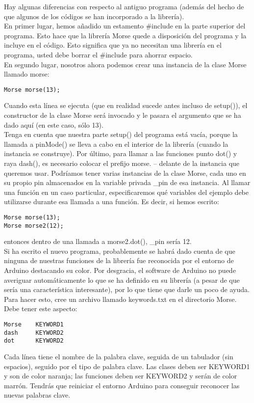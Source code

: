 Hay algunas diferencias con respecto al antiguo programa (además del hecho de que algunos de los códigos se han incorporado a la librería).\\
En primer lugar, hemos añadido un estamento \#include en la parte superior del programa. Esto hace que la librería Morse quede a disposición del programa y la incluye en el código. Esto significa que ya no necesitan una librería en el programa, usted debe borrar el \#include para ahorrar espacio.\\
En segundo lugar, nosotros ahora podemos crear una instancia de la clase Morse llamado morse:
\begin{lstlisting}
Morse morse(13);
\end{lstlisting}
Cuando esta línea se ejecuta (que en realidad sucede antes incluso de setup()), el constructor de la clase Morse será invocado y le pasara el argumento que se ha dado aquí (en este caso, sólo 13).\\
Tenga en cuenta que nuestra parte setup() del programa está vacía, porque la llamada a pinMode() se lleva a cabo en el interior de la librería (cuando la instancia se construye).
Por último, para llamar a las funciones punto \mbox{dot()} y raya \mbox{dash()}, es necesario colocar el prefijo morse. – delante de la instancia que queremos usar. Podríamos tener varias instancias de la clase Morse, cada uno en su propio pin almacenados en la variable privada \_pin de esa instancia. Al llamar una función en un caso particular, especificaremos qué variables del ejemplo debe utilizarse durante esa llamada a una función. Es decir, si hemos escrito:
\begin{lstlisting}
Morse morse(13);
Morse morse2(12);
\end{lstlisting}
entonces dentro de una llamada a morse2.dot(), \_pin sería 12.\\
Si ha escrito el nuevo programa, probablemente se habrá dado cuenta de que ninguna de nuestras funciones de la librería fue reconocida por el entorno de Arduino destacando su color. Por desgracia, el software de Arduino no puede averiguar automáticamente lo que se ha definido en su librería (a pesar de que sería una característica interesante), por lo que tiene que darle un poco de ayuda. Para hacer esto, cree un archivo llamado keywords.txt en el directorio Morse. Debe tener este aspecto:
\begin{lstlisting}
Morse    KEYWORD1
dash     KEYWORD2
dot      KEYWORD2
\end{lstlisting}
Cada línea tiene el nombre de la palabra clave, seguida de un tabulador (sin espacios), seguido por el tipo de palabra clave. Las clases deben ser KEYWORD1 y son de color naranja; las funciones deben ser KEYWORD2 y serán de color marrón. Tendrás que reiniciar el entorno Arduino para conseguir reconocer las nuevas palabras clave.\\
